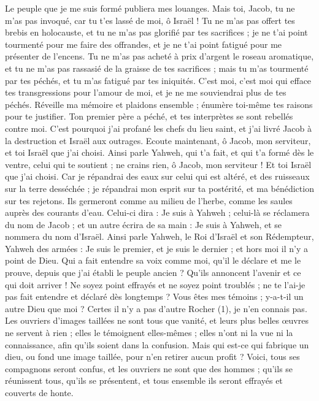 \begin{multicols}{2}
{Le peuple que je me suis formé publiera mes louanges.
Mais toi, Jacob, tu ne m'as pas invoqué, car tu t'es lassé de moi, ô Israël !
Tu ne m'as pas offert tes brebis en holocauste, et tu ne m'as pas glorifié par tes sacrifices ; je ne t'ai point tourmenté pour me faire des offrandes, et je ne t'ai point fatigué pour me présenter de l'encens.
Tu ne m'as pas acheté à prix d'argent le roseau aromatique, et tu ne m'as pas rassasié de la graisse de tes sacrifices ; mais tu m'as tourmenté par tes péchés, et tu m'as fatigué par tes iniquités.
C'est moi, c'est moi qui efface tes transgressions pour l'amour de moi, et je ne me souviendrai plus de tes péchés.
Réveille ma mémoire et plaidons ensemble ; énumère toi-même tes raisons pour te justifier.
Ton premier père a péché, et tes interprètes se sont rebellés contre moi.
C'est pourquoi j’ai profané les chefs du lieu saint, et j’ai livré Jacob à la destruction et Israël aux outrages.
\VerseOne{}Ecoute maintenant, ô Jacob, mon serviteur, et toi Israël que j'ai choisi.
Ainsi parle Yahweh, qui t'a fait, et qui t’a formé dès le ventre, celui qui te soutient ; ne crains rien, ô Jacob, mon serviteur ! Et toi Israël que j'ai choisi.
Car je répandrai des eaux sur celui qui est altéré, et des ruisseaux sur la terre desséchée ; je répandrai mon esprit sur ta postérité, et ma bénédiction sur tes rejetons.
Ils germeront comme au milieu de l’herbe, comme les saules auprès des courants d’eau.
Celui-ci dira : Je suis à Yahweh ; celui-là se réclamera du nom de Jacob ; et un autre écrira de sa main : Je suis à Yahweh, et se nommera du nom d'Israël.
Ainsi parle Yahweh, le Roi d'Israël et son Rédempteur, Yahweh des armées : Je suis le premier, et je suis le dernier ; et hors moi il n'y a point de Dieu.
Qui a fait entendre sa voix comme moi, qu’il le déclare et me le prouve, depuis que j’ai établi le peuple ancien ? Qu’ils annoncent l’avenir et ce qui doit arriver !
Ne soyez point effrayés et ne soyez point troublés ; ne te l'ai-je pas fait entendre et déclaré dès longtemps ? Vous êtes mes témoins ; y-a-t-il un autre Dieu que moi ? Certes il n'y a pas d'autre Rocher (1), je n'en connais pas.
Les ouvriers d’images taillées ne sont tous que vanité, et leurs plus belles œuvres ne servent à rien ; elles le témoignent elles-mêmes ; elles n’ont ni la vue ni la connaissance, afin qu'ils soient dans la confusion.
Mais qui est-ce qui fabrique un dieu, ou fond une image taillée, pour n'en retirer aucun profit ?
Voici, tous ses compagnons seront confus, et les ouvriers ne sont que des hommes ; qu’ils se réunissent tous, qu’ils se présentent, et tous ensemble ils seront effrayés et couverts de honte.
}
\end{multicols}
